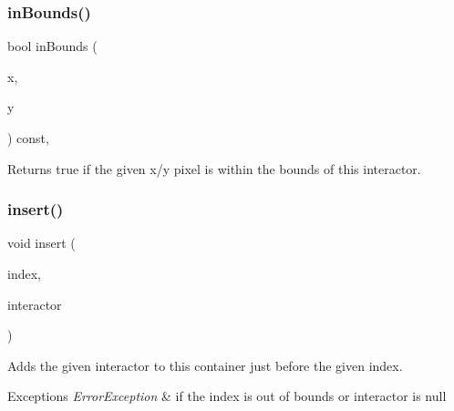 \subsubsection{\texorpdfstring{in\+Bounds()}{inBounds()}\hspace{0.1cm}{\footnotesize\ttfamily [2/2]}}
{\footnotesize\ttfamily bool in\+Bounds (\begin{DoxyParamCaption}\item[{int}]{x,  }\item[{int}]{y }\end{DoxyParamCaption}) const\hspace{0.3cm}{\ttfamily [virtual]}, {\ttfamily [inherited]}}



Returns true if the given x/y pixel is within the bounds of this interactor. 

\mbox{\label{classsgl_1_1GContainer_afffb8f789ff9a8466fbae5b846a0ebe7}} 
\subsubsection{\texorpdfstring{insert()}{insert()}\hspace{0.1cm}{\footnotesize\ttfamily [1/2]}}
{\footnotesize\ttfamily void insert (\begin{DoxyParamCaption}\item[{int}]{index,  }\item[{\mbox{\hyperlink{classsgl_1_1GInteractor}{G\+Interactor}} $\ast$}]{interactor }\end{DoxyParamCaption})\hspace{0.3cm}{\ttfamily [virtual]}}



Adds the given interactor to this container just before the given index. 


\begin{DoxyExceptions}{Exceptions}
{\em Error\+Exception} & if the index is out of bounds or interactor is null \\
\hline
\end{DoxyExceptions}
\mbox{\label{classsgl_1_1GContainer_a2e9d7c6d9e6769d4cfd3293afe7e215c}} 

